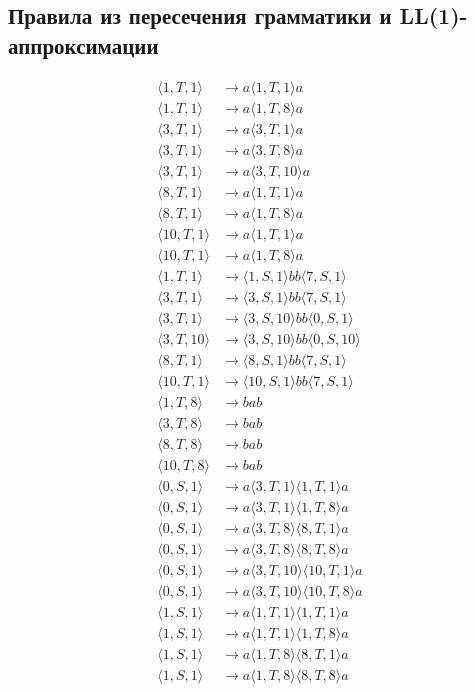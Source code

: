 \documentclass[12pt,a4paper]{article}
\begin{document}
\subsection*{Правила из пересечения грамматики и LL(1)-аппроксимации}
\[
\begin{aligned}
\langle1,T,1\rangle&\to a\langle1,T,1\rangle a\\
\langle1,T,1\rangle&\to a\langle1,T,8\rangle a\\
\langle3,T,1\rangle&\to a\langle3,T,1\rangle a\\
\langle3,T,1\rangle&\to a\langle3,T,8\rangle a\\
\langle3,T,1\rangle&\to a\langle3,T,10\rangle a\\
\langle8,T,1\rangle&\to a\langle1,T,1\rangle a\\
\langle8,T,1\rangle&\to a\langle1,T,8\rangle a\\
\langle10,T,1\rangle&\to a\langle1,T,1\rangle a\\
\langle10,T,1\rangle&\to a\langle1,T,8\rangle a\\
\langle1,T,1\rangle&\to \langle1,S,1\rangle bb\langle7,S,1\rangle\\
\langle3,T,1\rangle&\to \langle3,S,1\rangle bb\langle7,S,1\rangle\\
\langle3,T,1\rangle&\to \langle3,S,10\rangle bb\langle0,S,1\rangle\\
\langle3,T,10\rangle&\to \langle3,S,10\rangle bb\langle0,S,10\rangle\\
\langle8,T,1\rangle&\to \langle8,S,1\rangle bb\langle7,S,1\rangle\\
\langle10,T,1\rangle&\to \langle10,S,1\rangle bb\langle7,S,1\rangle\\
\langle1,T,8\rangle&\to bab\\
\langle3,T,8\rangle&\to bab\\
\langle8,T,8\rangle&\to bab\\
\langle10,T,8\rangle&\to bab\\
\langle0,S,1\rangle&\to a\langle3,T,1\rangle\langle1,T,1\rangle a\\
\langle0,S,1\rangle&\to a\langle3,T,1\rangle\langle1,T,8\rangle a\\
\langle0,S,1\rangle&\to a\langle3,T,8\rangle\langle8,T,1\rangle a\\
\langle0,S,1\rangle&\to a\langle3,T,8\rangle\langle8,T,8\rangle a\\
\langle0,S,1\rangle&\to a\langle3,T,10\rangle\langle10,T,1\rangle a\\
\langle0,S,1\rangle&\to a\langle3,T,10\rangle\langle10,T,8\rangle a\\
\langle1,S,1\rangle&\to a\langle1,T,1\rangle\langle1,T,1\rangle a\\
\langle1,S,1\rangle&\to a\langle1,T,1\rangle\langle1,T,8\rangle a\\
\langle1,S,1\rangle&\to a\langle1,T,8\rangle\langle8,T,1\rangle a\\
\langle1,S,1\rangle&\to a\langle1,T,8\rangle\langle8,T,8\rangle a\\
\end{aligned}
\]
\end{document}
